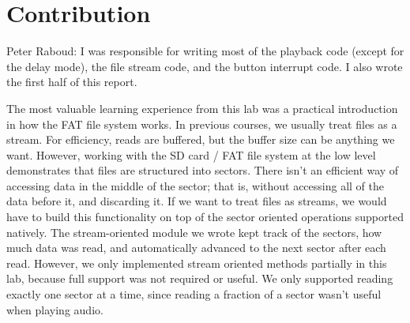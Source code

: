 \documentclass[12pt]{article}
\begin{document}
\section{Contribution}
Peter Raboud:
I was responsible for writing most of the playback code (except for the delay mode),
the file stream code, and the button interrupt code.
I also wrote the first half of this report.

The most valuable learning experience from this lab was a practical introduction
in how the FAT file system works.
In previous courses, we usually treat files as a stream.
For efficiency, reads are buffered, but the buffer size can be anything we want.
However, working with the SD card / FAT file system at the low level demonstrates
that files are structured into sectors.
There isn't an efficient way of accessing data in the middle of the sector; that
is, without accessing all of the data before it, and discarding it.
If we want to treat files as streams, we would have to build this functionality
on top of the sector oriented operations supported natively.
The stream-oriented module we wrote kept track of the sectors, how much data was
read, and automatically advanced to the next sector after each read.
However, we only implemented stream oriented methods partially in this lab,
because full support was not required or useful.
We only supported reading exactly one sector at a time, since reading a fraction
of a sector wasn't useful when playing audio.




\end{document}
